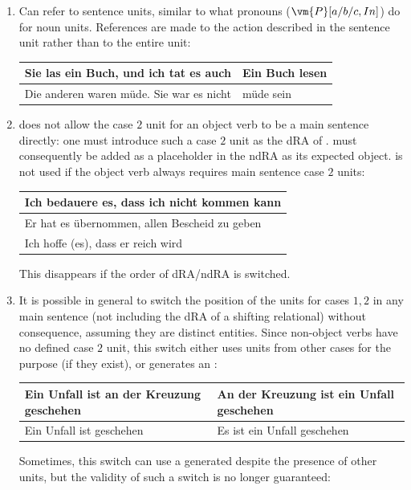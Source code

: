 \begin{enumerate}
\item Can refer to  sentence units, similar to what pronouns ($\vm{P}[a/b/c,In]$) do for noun units. References are  made to the action described in the sentence unit rather than to the entire unit:\begin{example}\begin{tabular}{m{9cm}|m{5cm}}
    Sie las ein Buch, und ich tat es auch & Ein Buch lesen\\\hline
    Die anderen waren müde. Sie war es nicht & müde sein \end{tabular}\end{example}
\item {} does not allow the case $2$ unit for an object verb to be a main sentence directly: one must  introduce such a case $2$ unit as the dRA of .  must consequently be added as a placeholder in the ndRA as its expected object.  is not used if the object verb always requires main sentence case $2$ units: \begin{example}\begin{tabular}{m{14cm}}
        Ich bedauere es, dass ich nicht kommen kann\\\hline Er hat es übernommen, allen Bescheid zu geben \\\hline Ich hoffe (es), dass er reich wird \end{tabular}\end{example}
    This  disappears if the order of dRA/ndRA is switched.
\item It is possible in general to switch the position of the units for cases $1,2$ in any main sentence (not including the dRA of a shifting relational) without consequence, assuming they are distinct entities. Since non-object verbs have no defined case $2$ unit, this switch either uses units from other cases for the purpose (if they exist), or generates an :\begin{example}\begin{tabular}{m{7cm}|m{7cm}}
    Ein Unfall ist an der Kreuzung geschehen & An der Kreuzung ist ein Unfall geschehen\\\hline
    Ein Unfall ist geschehen & Es ist ein Unfall geschehen \end{tabular}\end{example}
    Sometimes, this switch can use a generated  despite the presence of other units, but the validity of such a switch is no longer guaranteed:\begin{example}

\end{example}
\end{enumerate}
